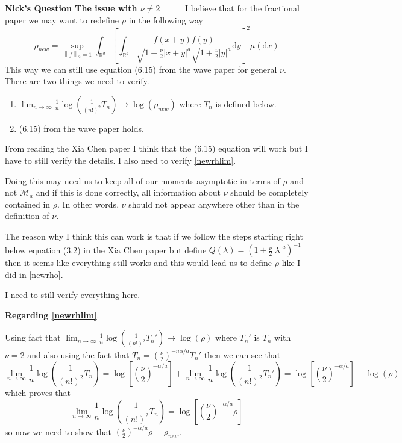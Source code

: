 \documentclass[a4paper,11pt]{article}
\numberwithin{equation}{section}
\theoremstyle{plain}
\theoremstyle{definition}
\newcommand{\ud}{\ensuremath{\mathrm{d} }}
\newcommand{\Norm}[1]{\left\|  #1   \right\|}
\newcommand{\R}{\mathbb{R}}
\newcounter{NQ}
\newenvironment{NickQuestion}[1][] %
{\refstepcounter{NQ}
	\begin{mdframed}[backgroundcolor=lightgray]\textbf{Nick's Question \theNQ \: #1~~}~~~\noindent}%
	{\end{mdframed}}
\numberwithin{NQ}{section}
\numberwithin{LQ}{section}
\numberwithin{ZQ}{section}
\begin{document}
	\begin{NickQuestion}[The issue with $\nu \not = 2$]\label{newrhoinfo}
		I believe that for the fractional paper we may want to redefine $\rho$ in the following way
		\begin{equation} \label{newrho}
		\rho_{new} = \sup_{\Norm{f}_2 =1} \int_{\R^d} \left[ \int_{\R^d} \frac{f(x+y)f(y)}{\sqrt{1+\frac{\nu}{2}|x+y|^a } \sqrt{1+\frac{\nu}{2}|y|^a} } \ud y \right]^2 \mu(\ud x)
		\end{equation}
		This way we can still use equation (6.15) from the wave paper for general $\nu$. There are two things we need to verify.
		\begin{enumerate}
			\item \label{newrhlim} $\lim_{n \to \infty} \frac{1}{n} \log\left( \frac{1}{(n!)^2}T_n \right) \to \log(\rho_{new})$ where $T_n$ is defined below.
			\item (6.15) from the wave paper holds.
		\end{enumerate}

		From reading the Xia Chen paper I think that the (6.15) equation will work but I have to still verify the details. I also need to verify \ref{newrhlim}.

		Doing this may need us to keep all of our moments asymptotic in terms of $\rho$ and not $\mathcal{M}_a$ and if this is done correctly, all information about $\nu$ should be completely contained in $\rho$. In other words, $\nu$ should not appear anywhere other than in the definition of $\nu$.

		The reason why I think this can work is that if we follow the steps starting right below equation (3.2) in the Xia Chen paper but define $Q(\lambda) = \left(  1+\frac{\nu}{2}|\lambda|^a \right) ^{-1}$ then it seems like everything still works and this would lead us to define $\rho$ like I did in \ref{newrho}.

		I need to still verify everything here.

		\noindent	\textbf{Regarding \ref{newrhlim}}.

		Using fact that $\lim_{n \to \infty} \frac{1}{n} \log\left( \frac{1}{(n!)^2}T_n' \right) \to \log(\rho)$ where $T_n'$ is $T_n$ with $\nu =2$ and  also using the fact that $T_n = \left(\frac{\nu}{2}\right)^{-n\alpha/a}T_n'$ then we can see that
		\[
		\lim_{n \to \infty} \frac{1}{n} \log\left( \frac{1}{(n!)^2}T_n \right) = \log\left[ \left( \frac{\nu}{2} \right)^{-\alpha/a} \right]+\lim_{n \to \infty} \frac{1}{n} \log\left( \frac{1}{(n!)^2}T_n' \right) = \log\left[ \left( \frac{\nu}{2} \right)^{-\alpha/a} \right] + \log(\rho)
		\]
		which proves that
		\[
		\lim_{n \to \infty} \frac{1}{n} \log\left( \frac{1}{(n!)^2}T_n \right) =
		\log\left[ \left( \frac{\nu}{2} \right)^{-\alpha/a} \rho \right]
		\]
		so now we need to show that $\left( \frac{\nu}{2} \right)^{-\alpha/a} \rho  = \rho_{new}$.


\end{NickQuestion}
\end{document}
